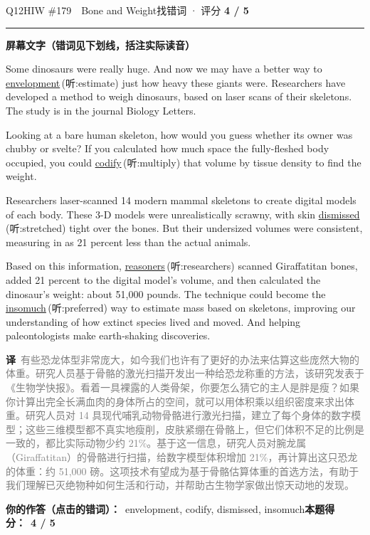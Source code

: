\documentclass[11pt]{article}
\newcommand{\ptesub}[1]{%
  \par\needspace{2\baselineskip}\smallskip
  {\color{cAccent}\rule[-0.2ex]{3pt}{1.05em}}\hspace{6pt}%
  {\bfseries\color{cHead}#1}\par\nopagebreak\smallskip}
\newcommand{\zh}[1]{{\footnotesize\textcolor{cNote}{\textbf{译}}\ \textcolor{gray}{#1}}}
\newcommand{\hiw}[2]{{\color{cWrong}\uline{#1}}\,{\footnotesize\color{cFix}(听:#2)}} %
\begin{document}
\begin{qblock}{Q12\quad HIW \#179\ \ Bone and Weight}{找错词 · 评分 \textcolor{cAccent}{\bfseries 4 / 5}}
\ptesub{屏幕文字（错词见下划线，括注实际读音）}
\begin{promptbox}
Some dinosaurs were really huge. And now we may have a better way to \hiw{envelopment}{estimate} just how heavy these giants were. Researchers have developed a method to weigh dinosaurs, based on laser scans of their skeletons. The study is in the journal Biology Letters.

Looking at a bare human skeleton, how would you guess whether its owner was chubby or svelte? If you calculated how much space the fully-fleshed body occupied, you could \hiw{codify}{multiply} that volume by tissue density to find the weight.

Researchers laser-scanned 14 modern mammal skeletons to create digital models of each body. These 3-D models were unrealistically scrawny, with skin \hiw{dismissed}{stretched} tight over the bones. But their undersized volumes were consistent, measuring in as 21 percent less than the actual animals.

Based on this information, {\color{cWrong}\uline{reasoners}}\,{\footnotesize\color{cFix}(听:researchers)} scanned Giraffatitan bones, added 21 percent to the digital model's volume, and then calculated the dinosaur's weight: about 51,000 pounds. The technique could become the \hiw{insomuch}{preferred} way to estimate mass based on skeletons, improving our understanding of how extinct species lived and moved. And helping paleontologists make earth-shaking discoveries.
\end{promptbox}
\zh{有些恐龙体型非常庞大，如今我们也许有了更好的办法来估算这些庞然大物的体重。研究人员基于骨骼的激光扫描开发出一种给恐龙称重的方法，该研究发表于《生物学快报》。看着一具裸露的人类骨架，你要怎么猜它的主人是胖是瘦？如果你计算出完全长满血肉的身体所占的空间，就可以用体积乘以组织密度来求出体重。研究人员对 14 具现代哺乳动物骨骼进行激光扫描，建立了每个身体的数字模型；这些三维模型都不真实地瘦削，皮肤紧绷在骨骼上，但它们体积不足的比例是一致的，都比实际动物少约 21\%。基于这一信息，研究人员对腕龙属（Giraffatitan）的骨骼进行扫描，给数字模型体积增加 21\%，再计算出这只恐龙的体重：约 51,000 磅。这项技术有望成为基于骨骼估算体重的首选方法，有助于我们理解已灭绝物种如何生活和行动，并帮助古生物学家做出惊天动地的发现。}
\par\smallskip
\textbf{你的作答（点击的错词）：}\ envelopment, codify, dismissed, insomuch\qquad\textbf{本题得分：}\ {\color{cAccent}\bfseries 4 / 5}
\end{qblock}
\end{document}
